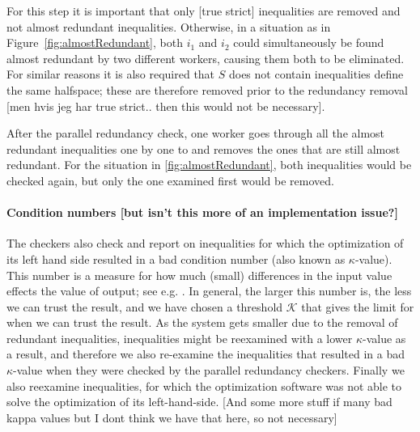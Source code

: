 For this step it is important that only [true strict] inequalities are removed and not almost redundant inequalities. Otherwise, in a situation as in Figure~\ref{fig:almostRedundant}, both $i_1$ and $i_2$ could simultaneously be found almost redundant by two different workers, causing them both to be eliminated. 
For similar reasons it is also required that $S$ does not contain inequalities define the same halfspace; these are therefore removed prior to the redundancy removal [men hvis jeg har true strict.. then this would not be necessary].

After the parallel redundancy check, one worker goes through all the almost redundant inequalities one by one to and removes the ones that are still almost redundant. For the situation in \ref{fig:almostRedundant}, both inequalities would be checked again, but only the one examined first would be removed.

\paragraph{Condition numbers [but isn't this more of an implementation issue?]}
The checkers also check and report on inequalities for which the optimization of its left hand side resulted in a bad condition number (also known as $\kappa$-value). This number is a measure for how much (small) differences in the input value effects the value of output; see {e.g. \cite{numAnalysis}}. In general, the larger this number is, the less we can trust the result, and we have chosen a threshold $\mathcal{K}$ that gives the limit for when we can trust the result. As the system gets smaller due to the removal of redundant inequalities, inequalities might be reexamined with a lower $\kappa$-value as a result, and therefore we also re-examine the inequalities that resulted in a bad $\kappa$-value when they were checked by the parallel redundancy checkers. 
Finally we also reexamine inequalities, for which the optimization software was not able to solve the optimization of its left-hand-side.
[And some more stuff if many bad kappa values but I dont think we have that here, so not necessary]

%
